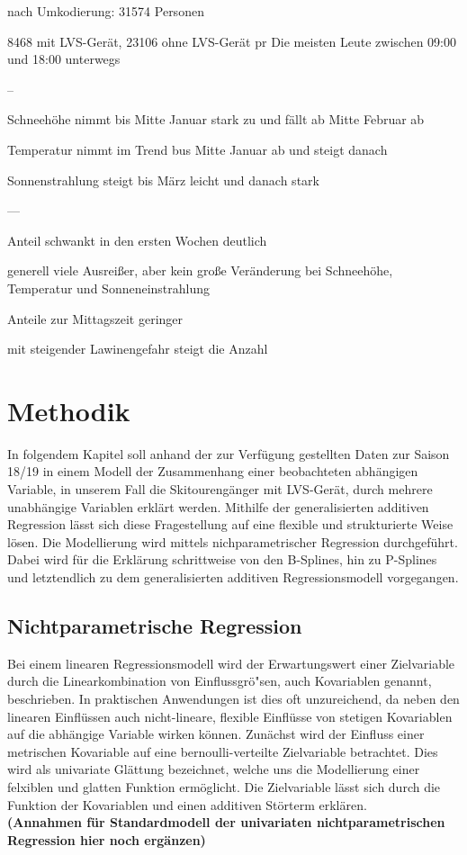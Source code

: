 \documentclass[12pt]{scrreprt}
\begin{document}
	nach Umkodierung: 31574 Personen
	
	8468 mit LVS-Gerät, 23106 ohne LVS-Gerät
	pr
	Die meisten Leute zwischen 09:00 und 18:00 unterwegs
	
	--
	
	Schneehöhe nimmt bis Mitte Januar stark zu und fällt ab Mitte Februar ab
	
	Temperatur nimmt im Trend bus Mitte Januar ab und steigt danach
	
	Sonnenstrahlung steigt bis März leicht und danach stark
	
	
	---
	
	
	Anteil schwankt in den ersten Wochen deutlich
	
	generell viele Ausreißer, aber kein große Veränderung bei Schneehöhe, Temperatur und Sonneneinstrahlung
	
	Anteile zur Mittagszeit geringer
	
	mit steigender Lawinengefahr steigt die Anzahl
	
	\chapter{Methodik}
	In folgendem Kapitel soll anhand der zur Verfügung gestellten Daten zur Saison 18/19 in einem Modell der Zusammenhang einer beobachteten abhängigen Variable, in unserem Fall die Skitourengänger mit LVS-Gerät,  durch mehrere unabhängige Variablen erklärt werden.
	Mithilfe der generalisierten additiven Regression lässt sich diese Fragestellung auf eine flexible und strukturierte Weise lösen. Die Modellierung wird mittels nichparametrischer Regression durchgeführt.
	Dabei wird für die Erklärung schrittweise von den B-Splines, hin zu P-Splines und letztendlich zu dem generalisierten additiven Regressionsmodell vorgegangen.
	
	\section{Nichtparametrische Regression}
	Bei einem linearen Regressionsmodell wird der Erwartungswert einer  Zielvariable durch die Linearkombination von Einflussgrö"sen, auch  Kovariablen genannt, beschrieben. In praktischen Anwendungen ist dies oft unzureichend, da neben den linearen Einflüssen auch nicht-lineare, flexible Einflüsse von stetigen Kovariablen auf die abhängige Variable wirken können.
	Zunächst wird der Einfluss einer metrischen Kovariable auf eine bernoulli-verteilte Zielvariable betrachtet. Dies wird als univariate Glättung bezeichnet, welche uns die Modellierung einer felxiblen und glatten Funktion ermöglicht. Die Zielvariable lässt sich durch die Funktion der Kovariablen und einen additiven Störterm erklären.\\
	\textbf{(Annahmen für Standardmodell der univariaten nichtparametrischen Regression hier noch ergänzen) }
	
\end{document}
